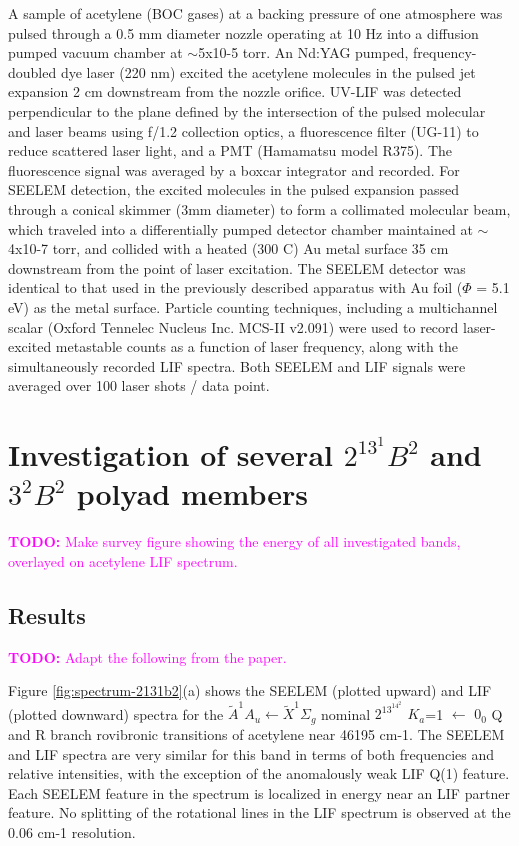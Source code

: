 \documentclass[12pt]{mitthesis}
\newcommand{\TODO} [1]{\textcolor{magenta}{\textbf{TODO:} #1}}
\begin{document}
A sample of acetylene (BOC gases) at a backing pressure of one
atmosphere was pulsed through a 0.5 mm diameter nozzle operating at 10
Hz into a diffusion pumped vacuum chamber at $\sim$5x10-5 torr.  An Nd:YAG
pumped, frequency-doubled dye laser (220 nm) excited the acetylene
molecules in the pulsed jet expansion 2 cm downstream from the nozzle
orifice. UV-LIF was detected perpendicular to the plane defined by the
intersection of the pulsed molecular and laser beams using f/1.2
collection optics, a fluorescence filter (UG-11) to reduce scattered
laser light, and a PMT (Hamamatsu model R375). The fluorescence signal
was averaged by a boxcar integrator and recorded. For SEELEM
detection, the excited molecules in the pulsed expansion passed
through a conical skimmer (3mm diameter) to form a collimated
molecular beam, which traveled into a differentially pumped detector
chamber maintained at $\sim$4x10-7 torr, and collided with a heated (300
C) Au metal surface 35 cm downstream from the point of laser
excitation. The SEELEM detector was identical to that used in the
previously described apparatus with Au foil ($\Phi$ = 5.1 eV) as the
metal surface.  Particle counting techniques, including a multichannel
scalar (Oxford Tennelec Nucleus Inc. MCS-II v2.091) were used to
record laser-excited metastable counts as a function of laser
frequency, along with the simultaneously recorded LIF spectra. Both
SEELEM and LIF signals were averaged over 100 laser shots / data
point.


\section{Investigation of several $2^13^1B^2$ and $3^2B^2$ polyad
  members}

\TODO{Make survey figure showing the energy of all investigated bands,
  overlayed on acetylene LIF spectrum.}

\subsection{Results}

\TODO{Adapt the following from the paper.}

Figure \ref{fig:spectrum-2131b2}(a) shows the SEELEM (plotted upward)
and LIF (plotted downward) spectra for the $\tilde{A}^1A_u \leftarrow
\tilde{X}^1\Sigma_g$ nominal $2^13^14^2$ $K_a$=1 $\leftarrow$ $0_0$ Q
and R branch rovibronic transitions of acetylene near 46195 cm-1. The
SEELEM and LIF spectra are very similar for this band in terms of both
frequencies and relative intensities, with the exception of the
anomalously weak LIF Q(1) feature. Each SEELEM feature in the spectrum
is localized in energy near an LIF partner feature. No splitting of
the rotational lines in the LIF spectrum is observed at the 0.06 cm-1
resolution.
\end{document}
